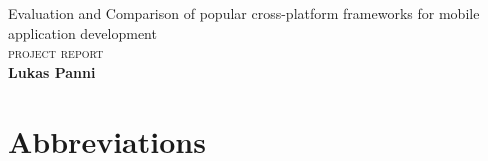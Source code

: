 \documentclass[12pt, oneside, titlepage]{book}
\newcommand{\Author}{Lukas Panni}
\newcommand{\Type}{project report}
\newcommand{\Title}{Evaluation and Comparison of popular cross-platform frameworks for mobile application development}
\begin{document}
\pagestyle{plain}

\begin{titlepage}
\begin{center}
\vspace*{-2cm}
{\Huge \Title}\\[1cm]
{\Huge\scshape \Type}\\[1cm]
{\large\bfseries \Author}\\[1cm]
\vfill
\end{center}
\end{titlepage}



\setcounter{page}{1}
\newpage
\tableofcontents
\listoffigures
\listoftables

\chapter*{Abbreviations}

\clearpage

\setcounter{page}{1}






\appendix

\end{document}
